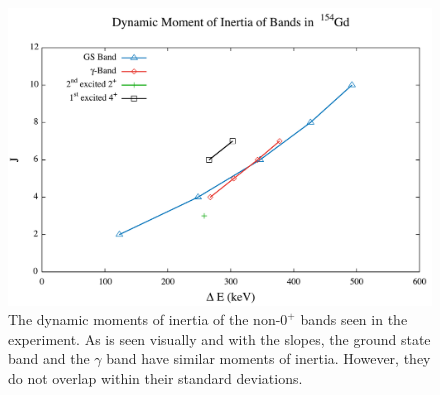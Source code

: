 \begin{figure}[!]
    \centering
    \includegraphics[scale=0.45]{154GdTablesAndFigs/154_Dynamic.pdf}
    \caption{The dynamic moments of inertia of the non-$0^+$ bands seen in the experiment. As is seen visually and with the slopes, the ground state band and the $\gamma$ band have similar moments of inertia. However, they do not overlap within their standard deviations.}
    \label{fig:154_Dynamic}
\end{figure}